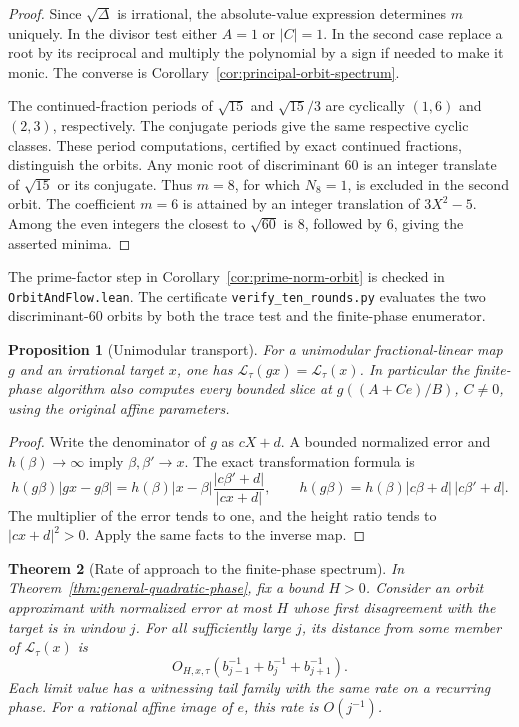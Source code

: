 \documentclass[11pt]{amsart}
\newtheorem{theorem}{Theorem}[section]
\newtheorem{proposition}[theorem]{Proposition}
\theoremstyle{definition}
\theoremstyle{remark}
\numberwithin{equation}{section}
\begin{document}
\begin{proof}
Since $\sqrt\Delta$ is irrational, the absolute-value expression
determines $m$ uniquely. In the divisor test either $A=1$ or
$|C|=1$. In the second case replace a root by its reciprocal and
multiply the polynomial by a sign if needed to make it monic.
The converse is Corollary~\ref{cor:principal-orbit-spectrum}.

The continued-fraction periods of $\sqrt{15}$ and $\sqrt{15}/3$
are cyclically $(1,6)$ and $(2,3)$, respectively. The conjugate
periods give the same respective cyclic classes. These period
computations, certified by exact continued fractions, distinguish
the orbits. Any monic root of discriminant $60$ is an integer
translate of $\sqrt{15}$ or its conjugate. Thus $m=8$, for which
$N_8=1$, is excluded in the second orbit. The coefficient $m=6$
is attained by an integer translation of $3X^2-5$.
Among the even integers the closest to $\sqrt{60}$ is $8$,
followed by $6$, giving the asserted minima.
\end{proof}

The prime-factor step in Corollary~\ref{cor:prime-norm-orbit}
is checked in \texttt{OrbitAndFlow.lean}. The certificate
\texttt{verify\_ten\_rounds.py} evaluates the two discriminant-$60$
orbits by both the trace test and the finite-phase enumerator.

\begin{proposition}[Unimodular transport]\label{prop:orbit-mobius}
For a unimodular fractional-linear map $g$ and an irrational target
$x$, one has $\mathcal L_\tau(gx)=\mathcal L_\tau(x)$.
In particular the finite-phase algorithm also computes every
bounded slice at $g((A+Ce)/B)$, $C\ne0$, using the original affine
parameters.
\end{proposition}

\begin{proof}
Write the denominator of $g$ as $cX+d$. A bounded normalized error
and $h(\beta)\to\infty$ imply $\beta,\beta'\to x$. The exact
transformation formula is
\[
 h(g\beta)|gx-g\beta|=
 h(\beta)|x-\beta|\frac{|c\beta'+d|}{|cx+d|},\qquad
 h(g\beta)=h(\beta)|c\beta+d|\,|c\beta'+d|.
\]
The multiplier of the error tends to one, and the height ratio
tends to $|cx+d|^2>0$. Apply the same facts to the inverse map.
\end{proof}

\begin{theorem}[Rate of approach to the finite-phase spectrum]
\label{thm:phase-convergence-rate}
In Theorem~\ref{thm:general-quadratic-phase}, fix a bound $H>0$.
Consider an orbit approximant with normalized error at most $H$
whose first disagreement with the target is in window $j$. For
all sufficiently large $j$, its distance from some member of
$\mathcal L_\tau(x)$ is
\[
 O_{H,x,\tau}\!\left(b_{j-1}^{-1}+b_j^{-1}+b_{j+1}^{-1}\right).
\]
Each limit value has a witnessing tail family with the same rate
on a recurring phase. For a rational affine image of $e$, this
rate is $O(j^{-1})$.
\end{theorem}
\end{document}
